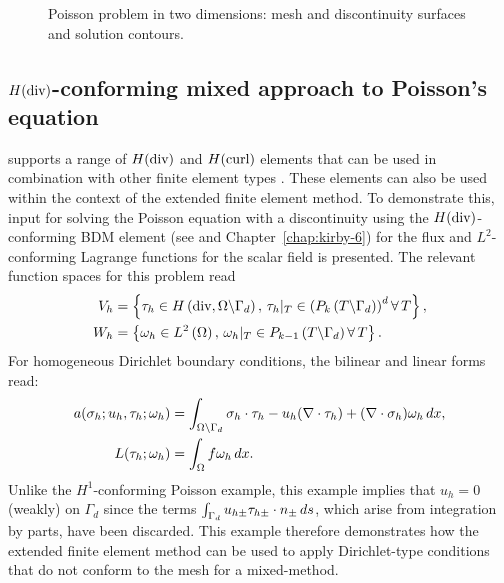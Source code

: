 \begin{figure}
{    \label{fig:nikbakht:poisson_contours_b}}
    \caption{Poisson problem in two dimensions:
   mesh and discontinuity surfaces
  and  solution contours.}
  \label{fig:nikbakht:poisson_contours}
\end{figure}

\subsection{$H(\rm div)$-conforming mixed approach to Poisson's equation}

\ffc{} supports a range of $H(\rm div)$ and $H(\rm curl)$ elements
that can be used in combination with other finite element types
\citep{RognesKirbyLogg2009}. These elements can also be used within the
context of the extended finite element method. To demonstrate this, \ufl{}
input for solving the Poisson equation with a discontinuity using the
$H(\rm div)$-conforming BDM element (see \citet{BrezziDouglasMarini1985}
and Chapter~\ref{chap:kirby-6}) for the flux and $L^{2}$-conforming Lagrange
functions for the scalar field is presented.  The relevant function
spaces for this problem read
%
\begin{align}
  V_{h} &= \left\{ {\tau_{h} \in H\left( {{\rm div}, \Omega\backslash\Gamma_{d}} \right), \,
         \tau_{h}|_{T} \in \left( {P_{k}\left( {T \backslash \Gamma_{d}} \right)} \right)^{d} \forall\, T} \right\},
\label{eqn:nikbakht:BDM_space}
\\
  W_{h} &= \left\{ {\omega_{h} \in L^{2}\left( {\Omega} \right), \,
         \omega_{h}|_{T} \in P_{k-1}\left( {T \backslash \Gamma_{d}} \right)\forall\, T} \right\}.
\label{eqn:nikbakht:DG_space}
\end{align}
%
For homogeneous Dirichlet boundary conditions, the bilinear and linear
forms read:
%
\begin{align}
  a(\sigma_{h}; u_{h}, \tau_{h}; \omega_{h})
    &= \int_{\Omega\backslash\Gamma_{d}} \sigma_{h} \cdot  \tau_{h}
        - u_{h} (\nabla \cdot \tau_{h}) + (\nabla \cdot \sigma_{h}) \omega_{h} \, d x,
\\
  L(\tau_{h}; \omega_{h}) &= \int_{\Omega} f \omega_{h}  \, d x.
\end{align}
%
Unlike the $H^{1}$-conforming Poisson example, this example implies that
$u_{h} = 0$ (weakly) on $\Gamma_{d}$ since the terms $\int_{\Gamma_{d}}
u_{h\pm} \tau_{h\pm} \cdot n_{\pm} \, d s$, which arise
from integration by parts, have been discarded.  This example therefore
demonstrates how the extended finite element method can be used to
apply Dirichlet-type conditions that do not conform to the mesh for
a mixed-method.

